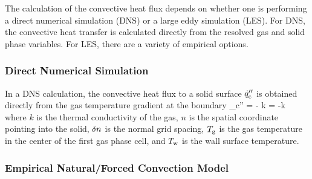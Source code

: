 The calculation of the convective heat flux depends on whether one is performing a direct numerical simulation (DNS) or a large eddy simulation (LES). For DNS, the convective heat transfer is calculated directly from the resolved gas and solid phase variables. For LES, there are a variety of empirical options.

\subsubsection{Direct Numerical Simulation}

In a DNS calculation, the convective heat flux to a solid surface $\dot{q}''_{\rm c}$ is obtained directly from the gas temperature gradient at the boundary
\be
   \dq_{\rm c}'' = - k \;  = -k 
\ee
where $k$ is the thermal conductivity of the gas, $n$ is the spatial coordinate pointing into the solid, $\delta n$ is the normal grid spacing, $T_{\rm g}$ is the gas temperature in the center of the first gas phase cell, and $T_{\rm w}$ is the wall surface temperature.

\subsubsection{Empirical Natural/Forced Convection Model}

